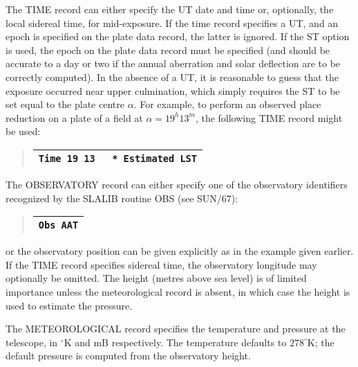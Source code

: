 The TIME record can either specify the UT date and time
or, optionally, the local sidereal time, for mid-exposure.
If the time record specifies
a UT, and an epoch is specified on the plate data record,
the latter is ignored.
If the ST option is used, the epoch on the plate data
record must be specified (and should be accurate to a day
or two if the annual aberration and solar deflection are
to be correctly computed).  In the absence of a
UT, it is reasonable to guess that the exposure occurred
near upper culmination, which simply requires the ST to
be set equal to the plate centre $\alpha$.  For example,
to perform an observed place reduction on a plate
of a field at $\alpha=19^{h}13^{m}$, the following
TIME record might be used:
\begin{quote}
\begin{tabular}{|l|}
\hline
\verb|Time 19 13   * Estimated LST| \\
\hline
\end{tabular}
\end{quote}
The OBSERVATORY record can either specify one of the
observatory identifiers recognized by the SLALIB routine
OBS (see SUN/67):
\begin{quote}
\begin{tabular}{|l|}
\hline
\verb|Obs AAT| \\
\hline
\end{tabular}
\end{quote}
or the observatory position can be given
explicitly as in the example given earlier.
If the TIME record specifies sidereal time, the observatory
longitude may optionally be omitted.
The height (metres
above sea level) is of limited importance unless the
meteorological record is absent, in which case the height
is used to estimate the pressure.

The METEOROLOGICAL record specifies the temperature and pressure
at the telescope, in $^\circ$K and mB respectively.  The
temperature defaults to $278^\circ$K; the default pressure
is computed from the observatory height.

